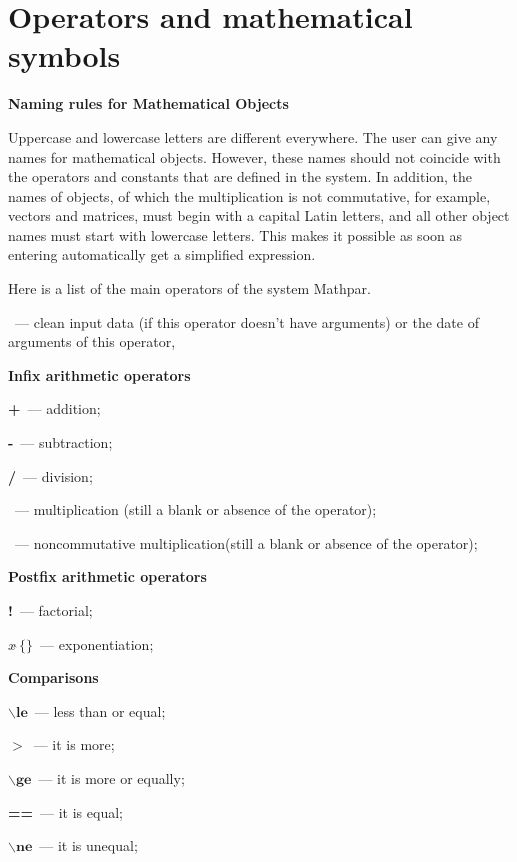 \chapter{Operators and mathematical symbols} 

{\bf Naming rules for Mathematical Objects}

\bigskip
 
Uppercase and lowercase letters are different everywhere. The user can give any names for mathematical objects. However, these names should not coincide with the operators and constants that are defined in the system. In addition, the names of objects, of which the multiplication is not commutative, for example, vectors and matrices, must begin with a capital Latin letters, and all other object names must start with lowercase letters. This makes it possible as soon as entering automatically get a simplified expression.
\bigskip

Here is a list of the main operators of the system Mathpar.   


~---  clean input data (if this operator doesn't have arguments) or the date of arguments of this operator,

\bigskip

{\bf Infix arithmetic operators}


{\bf +}~---  addition; 

{\bf -}~---  subtraction; 

{\bf /}~---  division;

{\bf *}~---  multiplication (still a blank or absence of the operator);

~--- noncommutative multiplication(still a blank or absence of the operator);  

\bigskip

\bigskip

{\bf Postfix arithmetic operators}

{\bf !}~---  factorial;

{ ${x} \widehat{\ }{\{ \}}$}~---  exponentiation;
\bigskip

{\bf Comparisons} 

$\mathbf{\backslash le}$~---  less than or equal;

${\mathbf >}$~---  it is more; 

$\mathbf{\backslash ge}$~--- it is more or equally; 

{\bf ==}~---  it is equal; 

$\mathbf{\backslash ne}$~--- it is unequal;  
\bigskip

